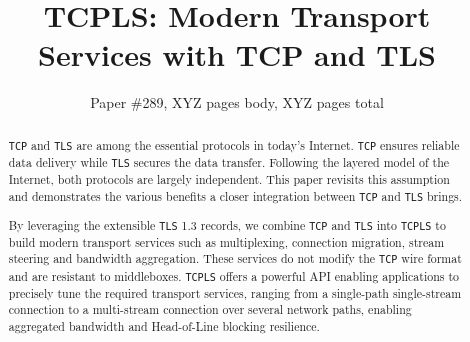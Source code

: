 \documentclass[10pt,sigconf,letterpaper,anonymous,nonacm]{acmart}
\newcommand{\tcpls}{\texttt{TCPLS}\xspace}
\newcommand{\tcp}{\texttt{TCP}\xspace}
\newcommand{\mptcp}{\texttt{MPTCP}\xspace}
\newcommand{\tls}{\texttt{TLS}\xspace}
\newcommand{\quic}{\texttt{QUIC}\xspace}
\begin{document}
\title{TCPLS: Modern Transport Services with TCP and TLS}

\author{Paper \#289, XYZ pages body, XYZ pages total}

\renewcommand{\shortauthors}{X.et al.}


\begin{abstract}
  \tcp and \tls are among the essential protocols in today's Internet. \tcp
  ensures reliable data delivery while \tls secures the data transfer.
  Following the layered model of the Internet, %
  both protocols are largely independent.
  This paper revisits this
  assumption and demonstrates the various benefits a closer integration between
  \tcp and \tls brings.
  
  By leveraging the extensible \tls 1.3 records, we combine \tcp and \tls into 
  \tcpls to 
  build modern transport services such as multiplexing, connection migration, 
  stream steering and bandwidth aggregation. These services do not modify the 
  \tcp wire 
  format and are resistant 
  to middleboxes. \tcpls offers a powerful API enabling applications to 
  precisely tune the required transport services, ranging from a single-path 
  single-stream connection to a multi-stream connection over several network 
  paths, enabling aggregated bandwidth and Head-of-Line blocking resilience.



\end{abstract}
\end{document}
